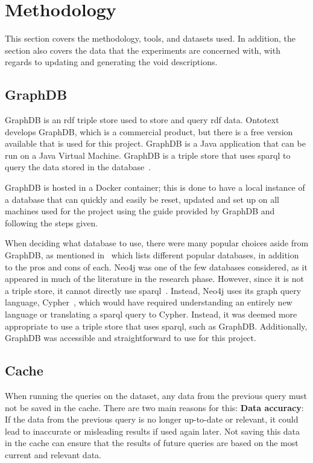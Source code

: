 \section{Methodology}\label{sec:methodology}
This section covers the methodology, tools, and datasets used. In addition, the section also covers the data that the experiments are concerned with, with regards to updating and generating the \gls{void} descriptions.

\subsection{GraphDB}\label{sec:graphdb}
GraphDB is an \gls{rdf} triple store used to store and query \gls{rdf} data. Ontotext develops GraphDB, which is a commercial product, but there is a free version available that is used for this project. GraphDB is a Java application that can be run on a Java Virtual Machine. GraphDB is a triple store that uses \gls{sparql} to query the data stored in the database~\cite{graphdb-product}.

GraphDB is hosted in a Docker container; this is done to have a local instance of a database that can quickly and easily be reset, updated and set up on all machines used for the project using the guide provided by GraphDB and following the steps given. 

When deciding what database to use, there were many popular choices aside from GraphDB, as mentioned in~\cite{best-graph-databases} which lists different popular databases, in addition to the pros and cons of each. Neo4j was one of the few databases considered, as it appeared in much of the literature in the research phase. However, since it is not a triple store, it cannot directly use \gls{sparql}~\cite{neo4j:-a-reasonable-RDF-graph-database}. Instead, Neo4j uses its graph query language, Cypher~\cite{cypher-query-language}, which would have required understanding an entirely new language or translating a \gls{sparql} query to Cypher. Instead, it was deemed more appropriate to use a triple store that uses \gls{sparql}, such as GraphDB. Additionally, GraphDB was accessible and straightforward to use for this project.

\subsection{Cache}\label{sec:cache}
When running the queries on the dataset, any data from the previous query must not be saved in the cache. There are two main reasons for this:
\textbf{Data accuracy}: If the data from the previous query is no longer up-to-date or relevant, it could lead to inaccurate or misleading results if used again later. Not saving this data in the cache can ensure that the results of future queries are based on the most current and relevant data.

